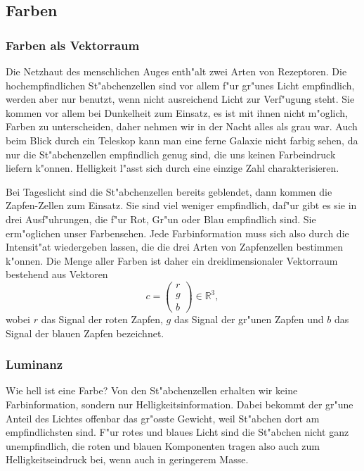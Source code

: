 %
%
%
\subsection{Farben}
\subsubsection{Farben als Vektorraum}
Die Netzhaut des menschlichen Auges enth"alt zwei Arten von Rezeptoren.
Die hochempfindlichen St"abchenzellen sind vor allem f"ur gr"unes Licht
empfindlich, werden aber nur benutzt, wenn nicht ausreichend Licht
zur Verf"ugung steht.
Sie kommen vor allem bei Dunkelheit zum Einsatz, es ist mit ihnen
nicht m"oglich, Farben zu unterscheiden, daher nehmen wir in der
Nacht alles als grau war.
Auch beim Blick durch ein Teleskop kann man eine ferne Galaxie nicht
farbig sehen, da nur die St"abchenzellen empfindlich genug sind, die
uns keinen Farbeindruck liefern k"onnen. Helligkeit l"asst sich durch
eine einzige Zahl charakterisieren.

Bei Tageslicht sind die St"abchenzellen
bereits geblendet, dann kommen die Zapfen-Zellen zum Einsatz.
Sie sind viel weniger empfindlich, daf"ur gibt es sie in drei Ausf"uhrungen,
die f"ur Rot, Gr"un oder Blau empfindlich sind.
Sie erm"oglichen unser Farbensehen.
Jede Farbinformation muss sich also durch die Intensit"at wiedergeben
lassen, die die drei Arten von Zapfenzellen bestimmen k"onnen.
Die Menge aller Farben ist daher ein dreidimensionaler Vektorraum
bestehend aus Vektoren
\[
c=\begin{pmatrix}r\\g\\b\end{pmatrix}
\in\mathbb R^3,
\]
wobei $r$ das Signal der roten Zapfen, $g$ das Signal der gr"unen Zapfen
und $b$ das Signal der blauen Zapfen bezeichnet.

\subsubsection{Luminanz}
Wie hell ist eine Farbe?
Von den St"abchenzellen erhalten wir keine
Farbinformation, sondern nur Helligkeitsinformation.
Dabei bekommt der gr"une Anteil des Lichtes offenbar das
gr"osste Gewicht, weil St"abchen dort am empfindlichsten sind.
F"ur rotes und blaues Licht sind die St"abchen nicht ganz unempfindlich,
die roten und blauen Komponenten tragen also auch zum Helligkeitseindruck
bei, wenn auch in geringerem Masse.

